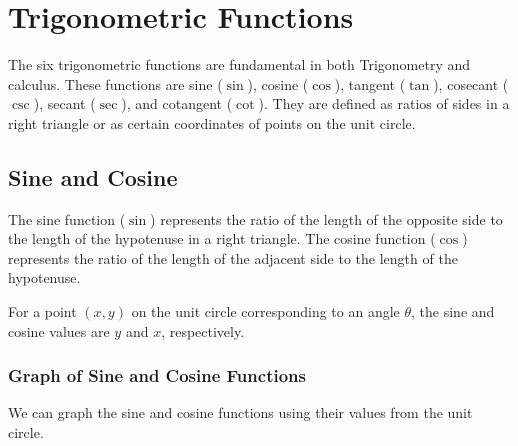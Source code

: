 \documentclass[a4paper,12pt]{book}
\begin{document}
\section{Trigonometric Functions}
\label{sec:trigonometric_functions}
The six trigonometric functions are fundamental in both Trigonometry and calculus. These functions are sine (\(\sin\)), cosine (\(\cos\)), tangent (\(\tan\)), cosecant (\(\csc\)), secant (\(\sec\)), and cotangent (\(\cot\)). They are defined as ratios of sides in a right triangle or as certain coordinates of points on the unit circle.

\subsection{Sine and Cosine}
\label{subsec:sine_cosine}
The sine function (\(\sin\)) represents the ratio of the length of the opposite side to the length of the hypotenuse in a right triangle. The cosine function (\(\cos\)) represents the ratio of the length of the adjacent side to the length of the hypotenuse.

For a point \((x, y)\) on the unit circle corresponding to an angle \(\theta\), the sine and cosine values are \(y\) and \(x\), respectively.

\subsubsection*{Graph of Sine and Cosine Functions}
We can graph the sine and cosine functions using their values from the unit circle.

\begin{center}
\end{center}
\end{document}
